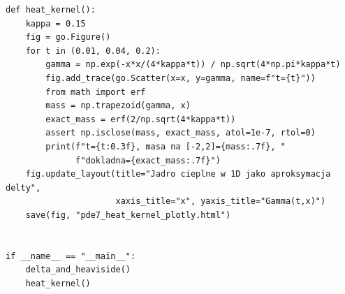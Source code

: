 \begin{lstlisting}[style=pythonpde,caption={Dystrybucje: przybliżone jedynki, funkcja Heaviside'a i jądro cieplne (Plotly)},label={code:pde-distributions}]
def heat_kernel():
    kappa = 0.15
    fig = go.Figure()
    for t in (0.01, 0.04, 0.2):
        gamma = np.exp(-x*x/(4*kappa*t)) / np.sqrt(4*np.pi*kappa*t)
        fig.add_trace(go.Scatter(x=x, y=gamma, name=f"t={t}"))
        from math import erf
        mass = np.trapezoid(gamma, x)
        exact_mass = erf(2/np.sqrt(4*kappa*t))
        assert np.isclose(mass, exact_mass, atol=1e-7, rtol=0)
        print(f"t={t:0.3f}, masa na [-2,2]={mass:.7f}, "
              f"dokladna={exact_mass:.7f}")
    fig.update_layout(title="Jadro cieplne w 1D jako aproksymacja delty",
                      xaxis_title="x", yaxis_title="Gamma(t,x)")
    save(fig, "pde7_heat_kernel_plotly.html")


if __name__ == "__main__":
    delta_and_heaviside()
    heat_kernel()
\end{lstlisting}


